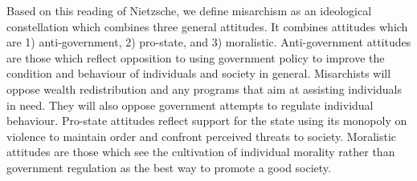 \documentclass[12pt,]{article}
\begin{document}
Based on this reading of Nietzsche, we define misarchism as an
ideological constellation which combines three general attitudes. It
combines attitudes which are 1) anti-government, 2) pro-state, and 3)
moralistic. Anti-government attitudes are those which reflect opposition
to using government policy to improve the condition and behaviour of
individuals and society in general. Misarchists will oppose wealth
redistribution and any programs that aim at assisting individuals in
need. They will also oppose government attempts to regulate individual
behaviour. Pro-state attitudes reflect support for the state using its
monopoly on violence to maintain order and confront perceived threats to
society. Moralistic attitudes are those which see the cultivation of
individual morality rather than government regulation as the best way to
promote a good society.
\end{document}
